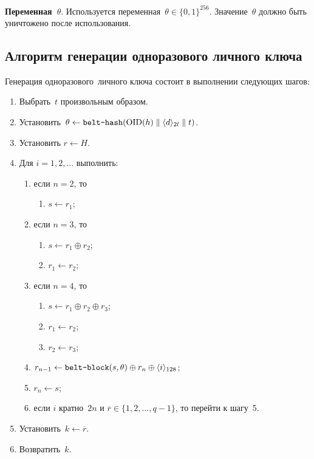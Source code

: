 {\bf Переменная~$\theta$}.
Используется переменная~$\theta\in\{0,1\}^{256}$.
Значение~$\theta$ должно быть уничтожено после использования.

\subsection{Алгоритм генерации одноразового личного ключа}
\label{GENK.Alg}

Генерация одноразового~личного ключа 
состоит в выполнении следующих шагов:
\begin{enumerate}
\item
Выбрать~$t$ произвольным образом.
\item
Установить~$\theta\leftarrow\texttt{belt-hash}
(\text{\normalfont OID}(h)\parallel\langle d\rangle_{2l}\parallel t)$.
\item
Установить $r\leftarrow H$.
\item
Для $i=1,2,\ldots$ выполнить:
\begin{enumerate}
\item
если $n=2$, то
\begin{enumerate}
\item
$s\leftarrow r_1$;
\end{enumerate}
\item
если $n=3$, то
\begin{enumerate}
\item
$s\leftarrow r_1\oplus r_2$;
\item
$r_1\leftarrow r_2$;
\end{enumerate}
\item
если $n=4$, то
\begin{enumerate}
\item
$s\leftarrow r_1\oplus r_2\oplus r_3$;
\item
$r_1\leftarrow r_2$;
\item
$r_2\leftarrow r_3$;
\end{enumerate}
\item
$r_{n-1}\leftarrow
\texttt{belt-block}(s,\theta)\oplus r_n\oplus\langle i\rangle_{128}$;
\item
$r_n\leftarrow s$;
\item
если $i$ кратно~$2n$ и $\overline{r}\in\{1,2,\ldots,q-1\}$,
то перейти к шагу~5.
\end{enumerate}
\item
Установить~$k\leftarrow \overline{r}$.
\item
Возвратить~$k$.
\end{enumerate}

